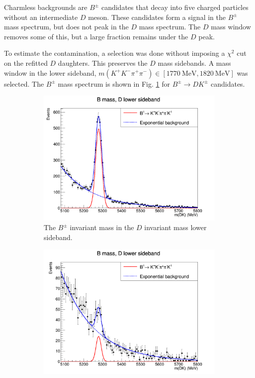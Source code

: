 \documentclass[12pt, a4paper, notitlepage, onecolumn]{article}
\numberwithin{equation}{section}
\begin{document}
Charmless backgrounds are $B^\pm$ candidates that decay into five charged particles without an intermediate $D$ meson. These candidates form a signal in the $B^\pm$ mass spectrum, but does not peak in the $D$ mass spectrum. The $D$ mass window removes some of this, but a large fraction remains under the $D$ peak.

To estimate the contamination, a selection was done without imposing a $\chi^2$ cut on the refitted $D$ daughters. This preserves the $D$ mass sidebands. A mass window in the lower sideband, $m(K^+K^-\pi^+\pi^-)\in[\SI{1770}{\mega\eV}, \SI{1820}{\mega\eV}]$ was selected. The $B^\pm$ mass spectrum is shown in Fig. \ref{fig_Bmass_charmless} for $B^\pm\to DK^\pm$ candidates.

\begin{figure}[H] 
  \centering
  \begin{subfigure}{0.5\textwidth}
    \centering
    \includegraphics[width=1\textwidth]{Plots/B2DKLower_Charmless.png}
    \caption{The $B^\pm$ invariant mass in the $D$ invariant mass lower sideband.}
    \label{fig_Bmass_charmless}
  \end{subfigure}%
  \begin{subfigure}{0.5\textwidth}
    \centering
    \includegraphics[width=1\textwidth]{Plots/B2DKLowerFDCut_Charmless.png}

\end{subfigure}
\end{figure}
\end{document}
